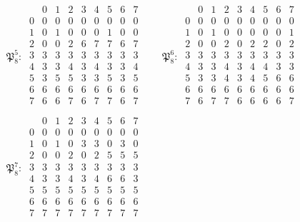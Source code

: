 \documentclass[11pt]{amsart}
\theoremstyle{definition}
\begin{document}
\begin{gather*}
\mathfrak P_8^{5}:\ \begin{array}{c|cccccccc} & 0 & 1 & 2 & 3 & 4 & 5 & 6 & 7\\ \hline 0 & 0 & 0 & 0 & 0 & 0 & 0 & 0 & 0\\ 1 & 0 & 1 & 0 & 0 & 0 & 1 & 0 & 0\\ 2 & 0 & 0 & 2 & 6 & 7 & 7 & 6 & 7\\ 3 & 3 & 3 & 3 & 3 & 3 & 3 & 3 & 3\\ 4 & 3 & 3 & 4 & 3 & 4 & 3 & 3 & 4\\ 5 & 3 & 5 & 5 & 3 & 3 & 5 & 3 & 5\\ 6 & 6 & 6 & 6 & 6 & 6 & 6 & 6 & 6\\ 7 & 6 & 6 & 7 & 6 & 7 & 7 & 6 & 7\\\end{array}\qquad \mathfrak P_8^{6}:\ \begin{array}{c|cccccccc} & 0 & 1 & 2 & 3 & 4 & 5 & 6 & 7\\ \hline 0 & 0 & 0 & 0 & 0 & 0 & 0 & 0 & 0\\ 1 & 0 & 1 & 0 & 0 & 0 & 0 & 0 & 1\\ 2 & 0 & 0 & 2 & 0 & 2 & 2 & 0 & 2\\ 3 & 3 & 3 & 3 & 3 & 3 & 3 & 3 & 3\\ 4 & 3 & 3 & 4 & 3 & 4 & 4 & 3 & 3\\ 5 & 3 & 3 & 4 & 3 & 4 & 5 & 6 & 6\\ 6 & 6 & 6 & 6 & 6 & 6 & 6 & 6 & 6\\ 7 & 6 & 7 & 7 & 6 & 6 & 6 & 6 & 7\\\end{array}\\[1ex]
\mathfrak P_8^{7}:\ \begin{array}{c|cccccccc} & 0 & 1 & 2 & 3 & 4 & 5 & 6 & 7\\ \hline 0 & 0 & 0 & 0 & 0 & 0 & 0 & 0 & 0\\ 1 & 0 & 1 & 0 & 3 & 3 & 0 & 3 & 0\\ 2 & 0 & 0 & 2 & 0 & 2 & 5 & 5 & 5\\ 3 & 3 & 3 & 3 & 3 & 3 & 3 & 3 & 3\\ 4 & 3 & 3 & 4 & 3 & 4 & 6 & 6 & 3\\ 5 & 5 & 5 & 5 & 5 & 5 & 5 & 5 & 5\\ 6 & 6 & 6 & 6 & 6 & 6 & 6 & 6 & 6\\ 7 & 7 & 7 & 7 & 7 & 7 & 7 & 7 & 7\\\end{array}
\end{gather*}
\end{document}
